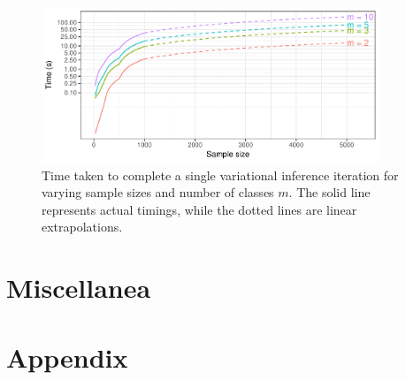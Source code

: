 \documentclass[a4paper,showframe,11pt]{report}
\begin{document}
\begin{figure}[hbt]
  \centering
  \includegraphics[width=0.9\textwidth]{figure/05-iprobit_runtime}
  \caption[Time taken to complete a single variational inference iteration]{Time taken to complete a single variational inference iteration for varying sample sizes and number of classes $m$. The solid line represents actual timings, while the dotted lines are linear extrapolations.}
\end{figure}


\section{Miscellanea}
%

\ifstandalone
  \section*{Appendix}
%  
%  
  
%  
\fi

\hClosingStuffStandalone
\end{document}
